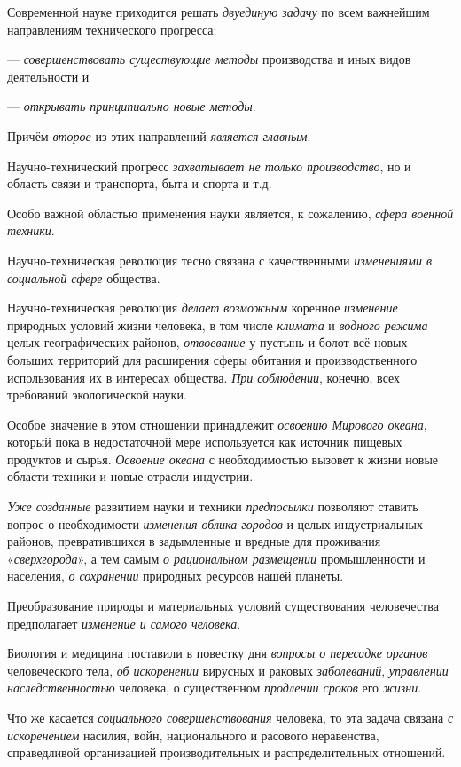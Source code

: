 \documentclass[a4paper,14pt,russian]{extreport}
\begin{document}
Современной науке приходится решать \emph{двуединую задачу} по всем важнейшим направлениям технического прогресса:

--- \emph{совершенствовать существующие методы} производства и иных видов деятельности и

--- \emph{открывать принципиально новые методы}.

Причём \emph{второе} из этих направлений \emph{является главным}.

Научно-технический прогресс \emph{захватывает не только производство}, но и область связи и транспорта, быта и спорта и т.д.

Особо важной областью применения науки является, к сожалению, \emph{сфера военной техники}.

Научно-техническая революция тесно связана с качественными \emph{изменениями в социальной сфере} общества.

Научно-техническая революция \emph{делает возможным} коренное \emph{изменение} природных условий жизни человека, в том числе \emph{климата} и \emph{водного режима} целых географических районов, \emph{отвоевание} у пустынь и болот всё новых больших территорий для расширения сферы обитания и производственного использования их в интересах общества. \emph{При соблюдении}, конечно, всех требований экологической науки.

Особое значение в этом отношении принадлежит \emph{освоению Мирового океана}, который пока в недостаточной мере используется как источник пищевых продуктов и сырья. \emph{Освоение океана} с необходимостью вызовет к жизни новые области техники и новые отрасли индустрии.

\emph{Уже созданные} развитием науки и техники \emph{предпосылки} позволяют ставить вопрос о необходимости \emph{изменения облика городов} и целых индустриальных районов, превратившихся в задымленные и вредные для проживания «\emph{сверхгорода}», а тем самым \emph{о рациональном размещении} промышленности и населения, \emph{о сохранении} природных ресурсов нашей планеты.

Преобразование природы и материальных условий существования человечества предполагает \emph{изменение и самого человека}.

Биология и медицина поставили в повестку дня \emph{вопросы о пересадке органов} человеческого тела, \emph{об искоренении} вирусных и раковых \emph{заболеваний}, \emph{управлении наследственностью} человека, о существенном \emph{продлении сроков} его \emph{жизни}.

Что же касается \emph{социального совершенствования} человека, то эта задача связана \emph{с искоренением} насилия, войн, национального и расового неравенства, справедливой организацией производительных и распределительных отношений.
\end{document}
